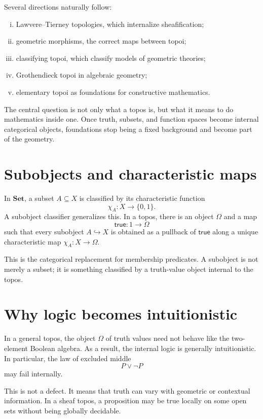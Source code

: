Several directions naturally follow:
\begin{enumerate}[(i)]
  \item Lawvere--Tierney topologies, which internalize sheafification;
  \item geometric morphisms, the correct maps between topoi;
  \item classifying topoi, which classify models of geometric theories;
  \item Grothendieck topoi in algebraic geometry;
  \item elementary topoi as foundations for constructive mathematics.
\end{enumerate}

\begin{question}
The central question is not only what a topos is, but what it means to do mathematics inside one.  Once truth, subsets, and function spaces become internal categorical objects, foundations stop being a fixed background and become part of the geometry.
\end{question}


\section{Subobjects and characteristic maps}

In \(\mathbf{Set}\), a subset \(A\subseteq X\) is classified by its characteristic function
\[
  \chi_A:X\to\{0,1\}.
\]
A subobject classifier generalizes this.  In a topos, there is an object \(\Omega\) and a map
\[
  \mathsf{true}:1\to\Omega
\]
such that every subobject \(A\hookrightarrow X\) is obtained as a pullback of \(\mathsf{true}\) along a unique characteristic map \(\chi_A:X\to\Omega\).

This is the categorical replacement for membership predicates.  A subobject is not merely a subset; it is something classified by a truth-value object internal to the topos.

\section{Why logic becomes intuitionistic}

In a general topos, the object \(\Omega\) of truth values need not behave like the two-element Boolean algebra.  As a result, the internal logic is generally intuitionistic.  In particular, the law of excluded middle
\[
  P\vee\neg P
\]
may fail internally.

This is not a defect.  It means that truth can vary with geometric or contextual information.  In a sheaf topos, a proposition may be true locally on some open sets without being globally decidable.

